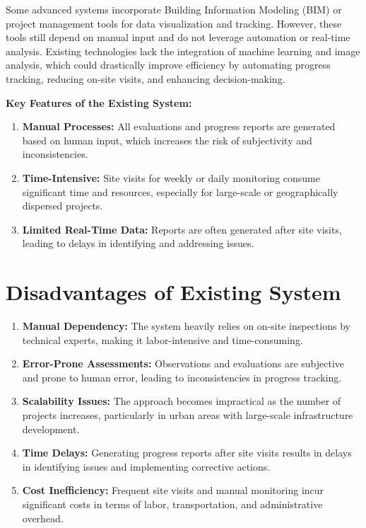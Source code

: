 \documentclass[12pt,a4paper]{report}
\begin{document}
Some advanced systems incorporate Building Information Modeling (BIM) or project management tools for data visualization and tracking. However, these tools still depend on manual input and do not leverage automation or real-time analysis. Existing technologies lack the integration of machine learning and image analysis, which could drastically improve efficiency by automating progress tracking, reducing on-site visits, and enhancing decision-making.

\textbf{Key Features of the Existing System:}
\begin{enumerate}
    \item \textbf{Manual Processes:} All evaluations and progress reports are generated based on human input, which increases the risk of subjectivity and inconsistencies.
    \item \textbf{Time-Intensive:} Site visits for weekly or daily monitoring consume significant time and resources, especially for large-scale or geographically dispersed projects.
    \item \textbf{Limited Real-Time Data:} Reports are often generated after site visits, leading to delays in identifying and addressing issues.
\end{enumerate}

\section{Disadvantages of Existing System}
\begin{enumerate}
    \item \textbf{Manual Dependency:} The system heavily relies on on-site inspections by technical experts, making it labor-intensive and time-consuming.
    \item \textbf{Error-Prone Assessments:} Observations and evaluations are subjective and prone to human error, leading to inconsistencies in progress tracking.
    \item \textbf{Scalability Issues:} The approach becomes impractical as the number of projects increases, particularly in urban areas with large-scale infrastructure development.
    \item \textbf{Time Delays:} Generating progress reports after site visits results in delays in identifying issues and implementing corrective actions.
    \item \textbf{Cost Inefficiency:} Frequent site visits and manual monitoring incur significant costs in terms of labor, transportation, and administrative overhead.
\end{enumerate}
\end{document}
